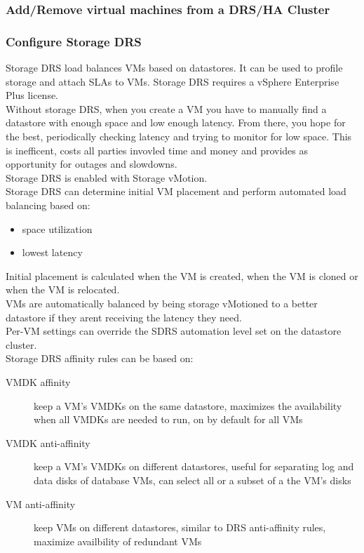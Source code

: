 \subsubsection{Add/Remove virtual machines from a DRS/HA Cluster}

\subsubsection{Configure Storage DRS}

Storage DRS load balances VMs based on datastores. It can be used to profile
storage and attach SLAs to VMs. Storage DRS requires a vSphere Enterprise
Plus license.\\

Without storage DRS, when you create a VM you have to manually find a
datastore with enough space and low enough latency. From there, you hope for
the best, periodically checking latency and trying to monitor for low space.
This is inefficent, costs all parties invovled time and money and provides
as opportunity for outages and slowdowns.\\

Storage DRS is enabled with Storage vMotion.\\

Storage DRS can determine initial VM placement and perform automated load
balancing based on:

\begin{itemize}

\item space utilization
\item lowest latency

\end{itemize}

Initial placement is calculated when the VM is created, when the VM is cloned
or when the VM is relocated.\\

VMs are automatically balanced by being storage vMotioned to a better
datastore if they arent receiving the latency they need.\\

Per-VM settings can override the SDRS automation level set on the datastore
cluster.\\

Storage DRS affinity rules can be based on:

\begin{description}

\item[VMDK affinity]
keep a VM's VMDKs on the same datastore, maximizes the availability when all
VMDKs are needed to run, on by default for all VMs

\item[VMDK anti-affinity]
keep a VM's VMDKs on different datastores, useful for separating log and data
disks of database VMs, can select all or a subset of a the VM's disks

\item[VM anti-affinity]
keep VMs on different datastores, similar to DRS anti-affinity rules, maximize
availbility of redundant VMs

\end{description}

